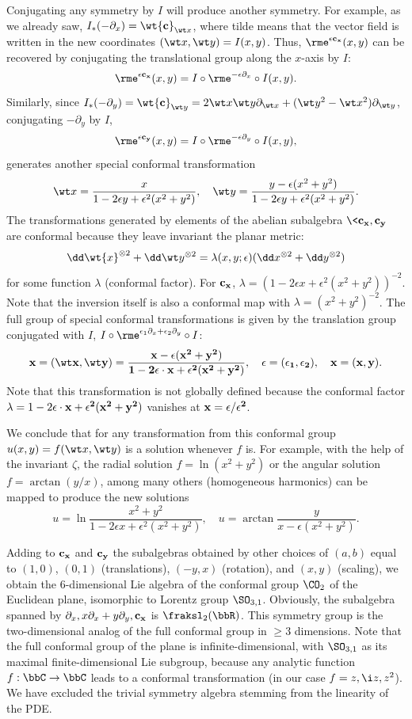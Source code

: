 \begin{example}
    Conjugating any symmetry by $I$ will produce another symmetry. For example, as we already saw, $I_\ast(-\partial_x)=\wt{\bf{c}}_{\wt x}$, where tilde means that the vector field is written in the new coordinates $(\wt x,\wt y)=I(x,y)$. Thus, $\rme^{\epsilon \bf{c}_x}(x,y)$ can be recovered by conjugating the translational group along the $x$-axis by $I$:
    \[\rme^{\epsilon\bf{c}_x}(x,y)=I\circ\rme^{-\epsilon\partial_x}\circ I(x,y).\]
    Similarly, since $I_\ast(-\partial_y)=\wt{\bf{c}}_{\wt y}=2\wt x\wt y\partial_{\wt x}+(\wt y^2-\wt x^2)\partial_{\wt y}$, conjugating $-\partial_y$ by $I$,
    \[\rme^{\epsilon\bf{c}_y}(x,y)=I\circ\rme^{-\epsilon\partial_y}\circ I(x,y),\]
    generates another special conformal transformation 
    \[\wt x=\frac{x}{1-2\epsilon y+\epsilon^2(x^2+y^2)},\quad \wt y=\frac{y-\epsilon(x^2+y^2)}{1-2\epsilon y+\epsilon^2(x^2+y^2)}.\]
    The transformations generated by elements of the abelian subalgebra $\<\bf{c}_x,\bf{c}_y\>$ are conformal because they leave invariant the planar metric:
    \[\dd \wt{x}^{\otimes 2}+\dd\wt y^{\otimes 2}=\lambda(x,y;\epsilon)(\dd x^{\otimes 2}+\dd y^{\otimes 2})\]
    for some function $\lambda$ (conformal factor). For $\bf{c}_x$, $\lambda=(1-2\epsilon x+\epsilon^2(x^2+y^2))^{-2}$. Note that the inversion itself is also a conformal map with $\lambda=(x^2+y^2)^{-2}$. The full group of special conformal transformations is given by the translation group conjugated with $I$, $I\circ\rme^{\epsilon_1\partial_x+\epsilon_2\partial_y}\circ I$:
    \[\bf{x}=(\wt x,\wt y)=\frac{\bf{x}-\bf{\epsilon}(x^2+y^2)}{1-2\bf{\epsilon}\cdot\bf{x}+\epsilon^2(x^2+y^2)},\quad \bf{\epsilon}=(\epsilon_1,\epsilon_2),\quad \bf{x}=(x,y).\]
    Note that this transformation is not globally defined because the conformal factor $\lambda=1-2\bf{\epsilon}\cdot\bf{x}+\epsilon^2(x^2+y^2)$ vanishes at $\bf{x}=\bf{\epsilon}/\epsilon^2$.

    We conclude that for any transformation from this conformal group $u(x,y)=f(\wt x,\wt y)$ is a solution whenever $f$ is. For example, with the help of the invariant $\zeta$, the radial solution $f=\ln(x^2+y^2)$ or the angular solution $f=\arctan(y/x)$, among many others (homogeneous harmonics) can be mapped to produce the new solutions 
    \[u=\ln\frac{x^2+y^2}{1-2\epsilon x+\epsilon^2(x^2+y^2)},\quad u=\arctan\frac{y}{x-\epsilon(x^2+y^2)}.\]

    Adding to $\bf{c}_x$ and $\bf{c}_y$ the subalgebras obtained by other choices of $(a,b)$ equal to $(1,0)$, $(0,1)$ (translations), $(-y,x)$ (rotation), and $(x,y)$ (scaling), we obtain the $6$-dimensional Lie algebra of the conformal group $\CO_2$ of the Euclidean plane, isomorphic to Lorentz group $\SO_{3,1}$. Obviously, the subalgebra spanned by $\partial_x,x\partial_x+y\partial_y,\bf{c}_x$ is $\fraksl_2(\bbR)$. This symmetry group is the two-dimensional analog of the full conformal group in $\geq 3$ dimensions. Note that the full conformal group of the plane is infinite-dimensional, with $\SO_{3,1}$ as its maximal finite-dimensional Lie subgroup, because any analytic function $f:\bbC\to\bbC$ leads to a conformal transformation (in our case $f=z,\i z,z^2$). We have excluded the trivial symmetry algebra stemming from the linearity of the PDE.
\end{example}
